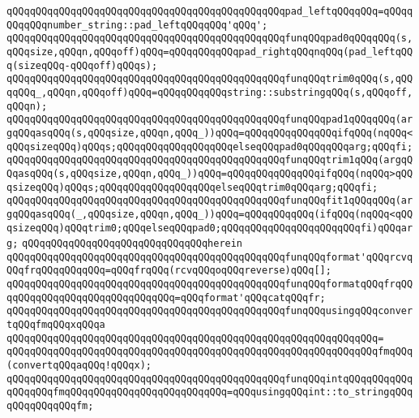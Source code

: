 \verb|qQQqqQQqqQQqqQQqqQQqqQQqqQQqqQQqqQQqqQQqqQQqqQQqpad_leftqQQqqQQq=qQQqqQQqqQQqnumber_string::pad_leftqQQqqQQq'qQQq';|\newline
\newline
\verb|qQQqqQQqqQQqqQQqqQQqqQQqqQQqqQQqqQQqqQQqqQQqqQQqfunqQQqpad0qQQqqQQq(s,qQQqsize,qQQqn,qQQqoff)qQQq=qQQqqQQqqQQqpad_rightqQQqnqQQq(pad_leftqQQq(sizeqQQq-qQQqoff)qQQqs);|\newline
\verb|qQQqqQQqqQQqqQQqqQQqqQQqqQQqqQQqqQQqqQQqqQQqqQQqfunqQQqtrim0qQQq(s,qQQqqQQq_,qQQqn,qQQqoff)qQQq=qQQqqQQqqQQqstring::substringqQQq(s,qQQqoff,qQQqn);|\newline
\newline
\verb|qQQqqQQqqQQqqQQqqQQqqQQqqQQqqQQqqQQqqQQqqQQqqQQqfunqQQqpad1qQQqqQQq(argqQQqasqQQq(s,qQQqsize,qQQqn,qQQq_))qQQq=qQQqqQQqqQQqqQQqifqQQq(nqQQq<qQQqsizeqQQq)qQQqs;qQQqqQQqqQQqqQQqqQQqelseqQQqpad0qQQqqQQqarg;qQQqfi;|\newline
\verb|qQQqqQQqqQQqqQQqqQQqqQQqqQQqqQQqqQQqqQQqqQQqqQQqfunqQQqtrim1qQQq(argqQQqasqQQq(s,qQQqsize,qQQqn,qQQq_))qQQq=qQQqqQQqqQQqqQQqifqQQq(nqQQq>qQQqsizeqQQq)qQQqs;qQQqqQQqqQQqqQQqqQQqelseqQQqtrim0qQQqarg;qQQqfi;|\newline
\verb|qQQqqQQqqQQqqQQqqQQqqQQqqQQqqQQqqQQqqQQqqQQqqQQqfunqQQqfit1qQQqqQQq(argqQQqasqQQq(_,qQQqsize,qQQqn,qQQq_))qQQq=qQQqqQQqqQQq(ifqQQq(nqQQq<qQQqsizeqQQq)qQQqtrim0;qQQqelseqQQqpad0;qQQqqQQqqQQqqQQqqQQqqQQqfi)qQQqarg;|\newline
\newline
\verb|qQQqqQQqqQQqqQQqqQQqqQQqqQQqqQQqherein|\newline
\newline
\verb|qQQqqQQqqQQqqQQqqQQqqQQqqQQqqQQqqQQqqQQqqQQqqQQqfunqQQqformat'qQQqrcvqQQqfrqQQqqQQqqQQq=qQQqfrqQQq(rcvqQQqoqQQqreverse)qQQq[];|\newline
\verb|qQQqqQQqqQQqqQQqqQQqqQQqqQQqqQQqqQQqqQQqqQQqqQQqfunqQQqformatqQQqfrqQQqqQQqqQQqqQQqqQQqqQQqqQQqqQQq=qQQqformat'qQQqcatqQQqfr;|\newline
\newline
\verb|qQQqqQQqqQQqqQQqqQQqqQQqqQQqqQQqqQQqqQQqqQQqqQQqfunqQQqusingqQQqconvertqQQqfmqQQqxqQQqa|\newline
\verb|qQQqqQQqqQQqqQQqqQQqqQQqqQQqqQQqqQQqqQQqqQQqqQQqqQQqqQQqqQQqqQQq=|\newline
\verb|qQQqqQQqqQQqqQQqqQQqqQQqqQQqqQQqqQQqqQQqqQQqqQQqqQQqqQQqqQQqqQQqfmqQQq(convertqQQqaqQQq!qQQqx);|\newline
\newline
\verb|qQQqqQQqqQQqqQQqqQQqqQQqqQQqqQQqqQQqqQQqqQQqqQQqfunqQQqintqQQqqQQqqQQqqQQqqQQqfmqQQqqQQqqQQqqQQqqQQqqQQqqQQq=qQQqusingqQQqint::to_stringqQQqqQQqqQQqqQQqfm;|\newline
